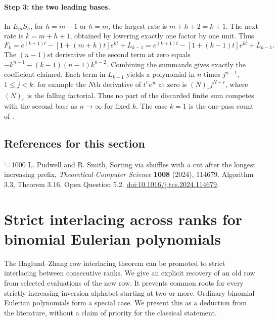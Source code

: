 \documentclass[11pt,a4paper]{article}
\makeatletter
\numberwithin{equation}{section}
\theoremstyle{definition}
\theoremstyle{remark}
\newenvironment{sectionabstract}{\par\smallskip\begingroup\small\noindent}{\par\endgroup\medskip}
\renewenvironment{thebibliography}[1]
 {\subsection*{References for this section}\small
  \list{\@biblabel{\@arabic\c@enumiv}}
       {\settowidth\labelwidth{\@biblabel{#1}}\leftmargin\labelwidth
        \advance\leftmargin\labelsep\@openbib@code
        \usecounter{enumiv}\let\p@enumiv\@empty
        \renewcommand\theenumiv{\@arabic\c@enumiv}}
  \sloppy\clubpenalty4000\widowpenalty4000\sfcode`\.=1000\relax}
 {\def\@noitemerr{\@latex@warning{Empty bibliography}}\endlist}
\makeatother
\begin{document}
\paragraph{Step 3: the two leading bases.} In $E_mS_h$, for $h=m-1$ or
$h=m$, the largest rate is $m+h+2=k+1$. The next rate is
$k=m+h+1$, obtained by lowering exactly one factor by one unit. Thus
\[
 F_k=e^{(k+1)t}-[1+(m+h)t]e^{kt}+L_{k-1}
     =e^{(k+1)t}-[1+(k-1)t]e^{kt}+L_{k-1}.
\]
The $(n-1)$st derivative of the second term at zero equals
$-k^{n-1}-(k-1)(n-1)k^{n-2}$. Combining the summands gives exactly
the coefficient claimed. Each term in $L_{k-1}$ yields a polynomial
in $n$ times $j^{n-1}$, $1\le j<k$: for example the $N$th
derivative of $t^r e^{jt}$ at zero is $(N)_r j^{N-r}$, where
$(N)_r$ is the falling factorial. Thus no part of the discarded
finite sum competes with the second base as $n\to\infty$ for fixed $k$.
The case $k=1$ is the one-pass count of \cite[Theorem~3.16]{r32reiwa:ps}.

\begin{thebibliography}{1}
 L. Pudwell and R. Smith, Sorting via shuffles with a cut after
the longest increasing prefix, \emph{Theoretical Computer Science}
\textbf{1008} (2024), 114679. Algorithm 3.3, Theorem 3.16, Open Question 5.2.
\href{https://doi.org/10.1016/j.tcs.2024.114679}{doi:10.1016/j.tcs.2024.114679}.
\end{thebibliography}

\par\endgroup

\begingroup
\newcommand{\A}{\widetilde A}
\newcommand{\E}{\widetilde E}
\section{\texorpdfstring{Strict interlacing across ranks for binomial Eulerian polynomials}{Strict interlacing across ranks for binomial Eulerian polynomials}}\label{section:r32keio}
\par\medskip


\begin{sectionabstract}
The Haglund--Zhang row interlacing theorem can be promoted to strict interlacing between consecutive ranks. We give an explicit recovery of an old row from selected evaluations of the new row. It prevents common roots for every strictly increasing inversion alphabet starting at two or more. Ordinary binomial Eulerian polynomials form a special case. We present this as a deduction from the literature, without a claim of priority for the classical statement.
\end{sectionabstract}
\end{document}
